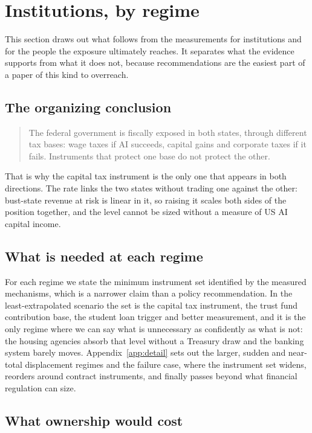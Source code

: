 \section{Institutions, by regime}
\label{sec:institutions}

This section draws out what follows from the measurements for institutions and for the people the
exposure ultimately reaches. It separates what the evidence supports from what it does not,
because recommendations are the easiest part of a paper of this kind to overreach.

\subsection{The organizing conclusion}

\begin{quote}
The federal government is fiscally exposed in both states, through different tax bases: wage taxes
if AI succeeds, capital gains and corporate taxes if it fails. Instruments that protect one base
do not protect the other.
\end{quote}

That is why the capital tax instrument is the only one that appears in both directions. The rate
links the two states without trading one against the other: bust-state revenue at risk is linear
in it, so raising it scales both sides of the position together, and the level cannot be sized
without a measure of US AI capital income.

\subsection{What is needed at each regime}

For each regime we state the minimum instrument set identified by the measured mechanisms, which
is a narrower claim than a policy recommendation. In the least-extrapolated scenario the set is
the capital tax instrument, the trust fund contribution base, the student loan trigger and better
measurement, and it is the only regime where we can say what is unnecessary as confidently as what
is not: the housing agencies absorb that level without a Treasury draw and the banking system
barely moves. Appendix~\ref{app:detail} sets out the larger, sudden and near-total displacement
regimes and the failure case, where the instrument set widens, reorders around contract
instruments, and finally passes beyond what financial regulation can size.

\subsection{What ownership would cost}

